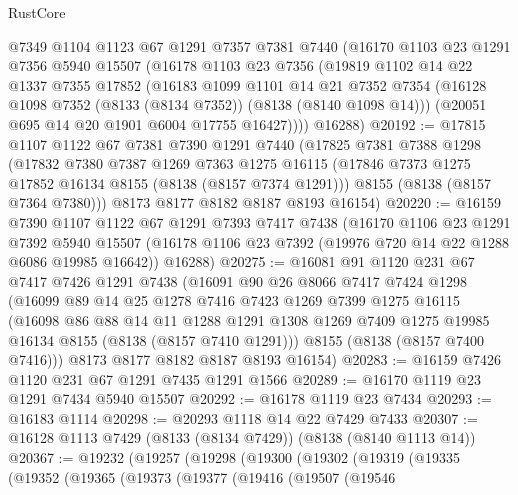 \begin{lexlean}{RustCore}
\begin{coremodule}
    @7349
    @1104
    @1123
    @67
    @1291
    @7357
    @7381
    @7440
    (@16170
      @1103
      @23
      @1291
      @7356
      @5940
      @15507
      (@16178
        @1103
        @23
        @7356
        (@19819
          @1102
          @14
          @22
          @1337
          @7355
          @17852
          (@16183
            @1099
            @1101
            @14
            @21
            @7352
            @7354
            (@16128 @1098 @7352 (@8133 (@8134 @7352)) (@8138 (@8140 @1098 @14)))
            (@20051 @695 @14 @20 @1901 @6004 @17755 @16427))))
      @16288)
@20192 := @17815
    @1107
    @1122
    @67
    @7381
    @7390
    @1291
    @7440
    (@17825
      @7381
      @7388
      @1298
      (@17832
        @7380
        @7387
        @1269
        @7363
        @1275
        @16115
        (@17846 @7373 @1275 @17852 @16134 @8155 (@8138 (@8157 @7374 @1291)))
        @8155
        (@8138 (@8157 @7364 @7380)))
      @8173
      @8177
      @8182
      @8187
      @8193
      @16154)
@20220 := @16159
    @7390
    @1107
    @1122
    @67
    @1291
    @7393
    @7417
    @7438
    (@16170
      @1106
      @23
      @1291
      @7392
      @5940
      @15507
      (@16178 @1106 @23 @7392 (@19976 @720 @14 @22 @1288 @6086 @19985 @16642))
      @16288)
@20275 := @16081
    @91
    @1120
    @231
    @67
    @7417
    @7426
    @1291
    @7438
    (@16091
      @90
      @26
      @8066
      @7417
      @7424
      @1298
      (@16099
        @89
        @14
        @25
        @1278
        @7416
        @7423
        @1269
        @7399
        @1275
        @16115
        (@16098
          @86
          @88
          @14
          @11
          @1288
          @1291
          @1308
          @1269
          @7409
          @1275
          @19985
          @16134
          @8155
          (@8138 (@8157 @7410 @1291)))
        @8155
        (@8138 (@8157 @7400 @7416)))
      @8173
      @8177
      @8182
      @8187
      @8193
      @16154)
@20283 := @16159 @7426 @1120 @231 @67 @1291 @7435 @1291 @1566
@20289 := @16170 @1119 @23 @1291 @7434 @5940 @15507
@20292 := @16178 @1119 @23 @7434
@20293 := @16183 @1114
@20298 := @20293 @1118 @14 @22 @7429 @7433
@20307 := @16128 @1113 @7429 (@8133 (@8134 @7429)) (@8138 (@8140 @1113 @14))
@20367 := @19232
    (@19257
      (@19298
        (@19300
          (@19302
            (@19319
              (@19335
                (@19352
                  (@19365
                    (@19373
                      (@19377
                        (@19416
                          (@19507
                            (@19546

\end{coremodule}
\end{lexlean}
